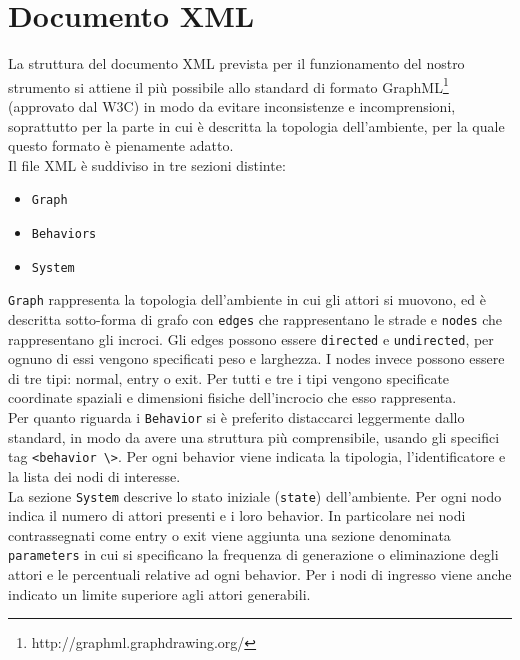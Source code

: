 \section{Documento XML}
La struttura del documento XML prevista per il funzionamento del nostro strumento si attiene il più possibile allo standard di formato GraphML\footnote{http://graphml.graphdrawing.org/} (approvato dal W3C) in modo da evitare inconsistenze e incomprensioni, soprattutto per la parte in cui è descritta la topologia dell'ambiente, per la quale questo formato è pienamente adatto.\\
Il file XML è suddiviso in tre sezioni distinte:
\begin{itemize}
\item \texttt{Graph}
\item \texttt{Behaviors}
\item \texttt{System}
\end{itemize} 
\texttt{Graph} rappresenta la topologia dell'ambiente in cui gli attori si muovono, ed è descritta sotto-forma di grafo con \texttt{edges} che rappresentano le strade e \texttt{nodes} che rappresentano gli incroci. Gli edges possono essere \texttt{directed} e \texttt{undirected}, per ognuno di essi vengono specificati peso e larghezza. I nodes invece possono essere di tre tipi: normal, entry o exit. Per tutti e tre i tipi vengono specificate coordinate spaziali e dimensioni fisiche dell'incrocio che esso rappresenta.\\
Per quanto riguarda i \texttt{Behavior} si è preferito distaccarci leggermente dallo standard, in modo da avere una struttura più comprensibile, usando gli specifici tag \texttt{<behavior \textbackslash>}. Per ogni behavior viene indicata la tipologia, l'identificatore e la lista dei nodi di interesse.\\
La sezione \texttt{System} descrive lo stato iniziale (\texttt{state}) dell'ambiente. Per ogni nodo indica il numero di attori presenti e i loro behavior. In particolare nei nodi contrassegnati come entry o exit viene aggiunta una sezione denominata \texttt{parameters} in cui si specificano la frequenza di generazione o eliminazione degli attori e le percentuali relative ad ogni behavior. Per i nodi di ingresso viene anche indicato un limite superiore agli attori generabili.

